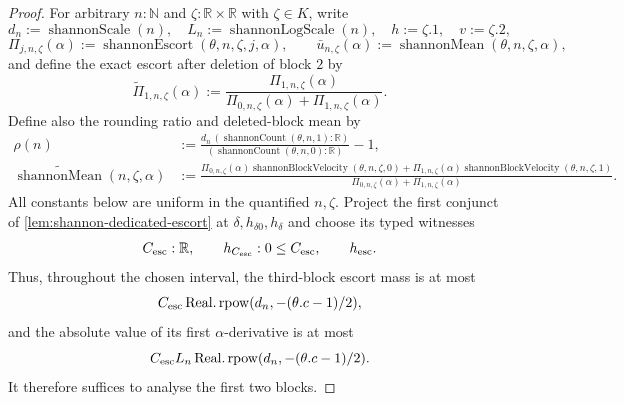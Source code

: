 \documentclass[9pt]{extarticle}
\theoremstyle{definition}
\theoremstyle{remark}
\newcommand{\R}{\mathbb R}
\newcommand{\N}{\mathbb N}
\begin{document}
\begin{proof}
For arbitrary $n:\N$ and $\zeta:\R\times\R$ with $\zeta\in K$, write
\[
 d_n:=\operatorname{shannonScale}(n),\quad
 L_n:=\operatorname{shannonLogScale}(n),\quad
 h:=\zeta.1,\quad v:=\zeta.2,
\]
\[
 \Pi_{j,n,\zeta}(\alpha):=
  \operatorname{shannonEscort}(\theta,n,\zeta,j,\alpha),\qquad
 \bar u_{n,\zeta}(\alpha):=
  \operatorname{shannonMean}(\theta,n,\zeta,\alpha),
\]
and define the exact escort after deletion of block $2$ by
\[
 \widetilde\Pi_{1,n,\zeta}(\alpha):=
 \frac{\Pi_{1,n,\zeta}(\alpha)}
      {\Pi_{0,n,\zeta}(\alpha)+\Pi_{1,n,\zeta}(\alpha)}.
\]
Define also the rounding ratio and deleted-block mean by
\begin{align*}
 \rho(n)&:=
  \frac{d_n\,(\operatorname{shannonCount}(\theta,n,1):\R)}
       {(\operatorname{shannonCount}(\theta,n,0):\R)}-1,\\
 \widetilde{\operatorname{shannonMean}}(n,\zeta,\alpha)&:=
 \frac{\Pi_{0,n,\zeta}(\alpha)
          \operatorname{shannonBlockVelocity}(\theta,n,\zeta,0)
       +\Pi_{1,n,\zeta}(\alpha)
          \operatorname{shannonBlockVelocity}(\theta,n,\zeta,1)}
      {\Pi_{0,n,\zeta}(\alpha)+\Pi_{1,n,\zeta}(\alpha)}.
\end{align*}
All constants below are uniform in the quantified $n,\zeta$.  Project the
first conjunct of \cref{lem:shannon-dedicated-escort} at
$\delta,h_{\delta0},h_\delta$ and choose its typed witnesses
\[
 C_{\rm esc}:\R,\qquad h_{C_{\rm esc}}:0\leq C_{\rm esc},\qquad h_{\rm esc}.
\]
Thus, throughout the chosen interval, the third-block escort mass is at most
\[
 C_{\rm esc}\operatorname{Real.rpow}
   (d_n,-(\theta.c-1)/2),
\]
and the absolute value of its first $\alpha$-derivative is at most
\[
 C_{\rm esc}L_n\operatorname{Real.rpow}
   (d_n,-(\theta.c-1)/2).
\]
It therefore suffices to analyse the first two blocks.


\end{proof}
\end{document}
